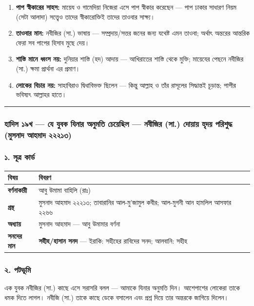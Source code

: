 \begin{enumerate}
\item \textbf{পাপ স্বীকারের সাহস:} মায়েয ও গামেদিয়া নিজেরা এসে পাপ স্বীকার করেছেন — পাপ ঢাকার সাধারণ নিয়ম (সেটা আলাদা) সত্ত্বেও তাদের স্বীকারোক্তিই তাদের তাওবার সাক্ষ্য।
\item \textbf{তাওবার মান:} নবীজির (সা.) ভাষায় — সম্প্রদায়/সত্তর জনের জন্য যথেষ্ট এমন তাওবা; অর্থাৎ অন্তরের আন্তরিক ফেরা সব পাপের হিসাব মুছে দেয়।
\item \textbf{শাস্তি মানে ধ্বংস নয়:} দুনিয়ার শাস্তি (হদ) আদায় — আখিরাতের শাস্তি থেকে মুক্তি; মায়েযের পেছনে নবীজির (সা.) ক্ষমা প্রার্থনা এর প্রমাণ।
\item \textbf{লোকের বিচার নয়:} সাহাবিরাও দ্বিধাবিভক্ত ছিলেন — কিন্তু আল্লাহ ও তাঁর রাসূলের সিদ্ধান্তই চূড়ান্ত; পাপীর ভবিষ্যৎ আল্লাহর হাতে।
\end{enumerate}
\medskip\hrule\medskip

\subsubsection*{হাদিস ১৯খ — যে যুবক যিনার অনুমতি চেয়েছিল — নবীজির (সা.) দোয়ায় হৃদয় পরিশুদ্ধ (মুসনাদ আহমাদ ২২২১৩)}

\subsubsection*{১. সূত্র কার্ড}

\begin{table}[h]\centering\small
\begin{tabular}{ll}
বিষয় & বিবরণ \\
\hline
\textbf{বর্ণনাকারী} & আবু উমামা বাহিলি (রাঃ) \\
\textbf{গ্রন্থ} & মুসনাদ আহমাদ ২২২১৩; তাবারানির আল-মু'জামুল কবীর; আল-মুগনী আন হামলিল আসফার ২২৬৬ \\
\textbf{অধ্যায়} & মুসনাদ আহমাদ — আবু উমামার বর্ণনা \\
\textbf{সনদের মান} & \textbf{সহীহ/হাসান সনদ} — ইরাকি: \lat{“}সহীহের রাবিদের সনদ\lat{”}; আলবানি: সহীহ \\
\hline
\end{tabular}
\end{table}

\subsubsection*{২. পটভূমি}

এক যুবক নবীজির (সা.) কাছে এসে সরাসরি বলল — আমাকে যিনার অনুমতি দিন। আশেপাশের লোকেরা তাকে ধমক দিতে লাগল। নবীজি (সা.) তাকে কাছে ডেকে বসালেন এবং প্রশ্ন দিয়ে তার অন্তরকে জাগিয়ে দিলেন।

